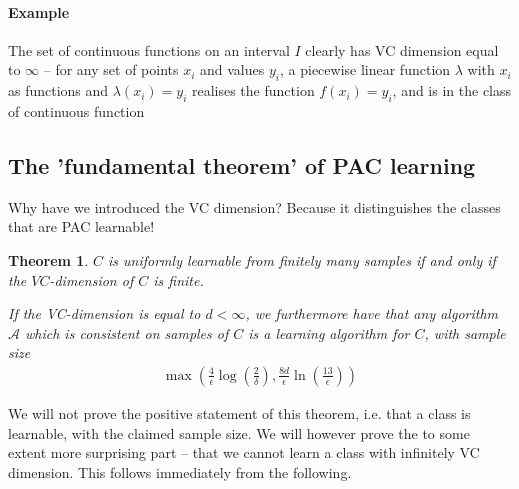 \documentclass{article}
\newcommand{\calA}{\mathcal{A}}
\newtheorem{theorem}{Theorem}
\begin{document}
\paragraph{Example} The set of continuous functions on an interval $I$ clearly has VC dimension equal to $\infty$ -- for any set of points $x_i$ and values $y_i$, a piecewise linear function $\lambda$ with $x_i$ as functions and $\lambda(x_i)=y_i$ realises the function $f(x_i)=y_i$, and is in the class of continuous function  

\subsection{The 'fundamental theorem' of PAC learning}

Why have we introduced the VC dimension? Because it distinguishes the classes that are PAC learnable!
\begin{theorem}
    $C$ is uniformly learnable from finitely many samples if and only if the $VC$-dimension of $C$ is finite.
    
    If the VC-dimension is equal to $d<\infty$, we furthermore have that any algorithm $\calA$ which is consistent on samples of $C$ is a learning algorithm for $C$, with sample size
    \begin{align*}
        \max \left(\frac{4}{\epsilon}\log\left(\frac{2}{\delta}\right), \frac{8d}{\epsilon}\ln\left(\frac{13}{\epsilon}\right)\right)
    \end{align*}
\end{theorem}

We will not prove the positive statement of this theorem, i.e. that a class is learnable, with the claimed sample size. We will however prove the to some extent more surprising part -- that we cannot learn a class with infinitely VC dimension. This follows immediately from the following.
\end{document}
